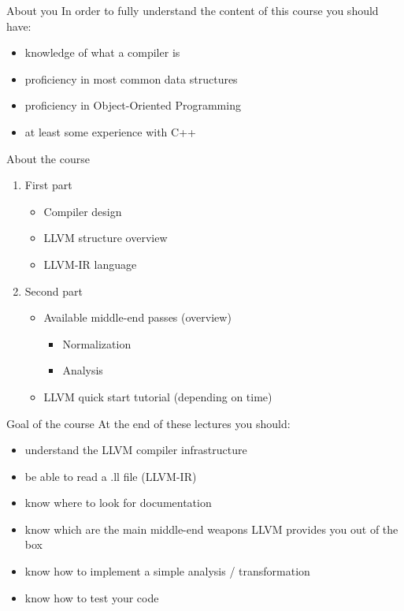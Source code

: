 \documentclass[10pt,mathserif]{beamer}
\begin{document}
\begin{frame}[t]{About you}
  In order to fully understand the content of this course you should have:
  \begin{itemize}
    \vfill
    \item knowledge of what a compiler is
    \vfill
    \item proficiency in most common data structures
    \vfill
    \item proficiency in Object-Oriented Programming
    \vfill
    \item at least some experience with C++
  \end{itemize}
\end{frame}

\begin{frame}[t]{About the course}
  \begin{Large}
  \vfill
  \begin{enumerate}
    \item First part
      \begin{itemize}
        \vfill
        \item Compiler design
        \vfill
        \item LLVM structure overview
        \vfill
        \item LLVM-IR language
    \end{itemize}
    \vfill
    \item Second part
      \begin{itemize}
        \item Available middle-end passes (overview)
        \vfill
        \begin{itemize}
          \item Normalization
        \vfill
          \item Analysis
        \end{itemize}
        \vfill
        \item LLVM quick start tutorial (depending on time)
      \end{itemize}
  \end{enumerate}
  \vfill
\end{Large}
\end{frame}

\begin{frame}[t]{Goal of the course}
  At the end of these lectures you should:
  \begin{itemize}
    \vfill
    \item understand the LLVM compiler infrastructure
    \vfill
    \item be able to read a .ll file (LLVM-IR)
    \vfill
    \item know where to look for documentation
    \vfill
    \item know which are the main middle-end weapons
          LLVM provides you out of the box
    \vfill
    \item know how to implement a simple analysis / transformation
    \vfill
    \item know how to test your code
  \end{itemize}
\end{frame}
\end{document}
